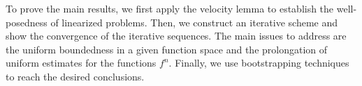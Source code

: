 \documentclass[11pt,reqno]{amsart}%
\theoremstyle{definition}
\theoremstyle{remark}
\begin{document}
%
%
%
%

To prove the main results, we first apply the velocity lemma to establish the well-posedness of linearized problems. Then, we construct an iterative scheme and show the convergence of the iterative sequences. The main issues to address are the uniform boundedness in a given function space and the prolongation of uniform estimates for the functions ${f^{n}}$. Finally, we use bootstrapping techniques to reach the desired conclusions.
\end{document}
